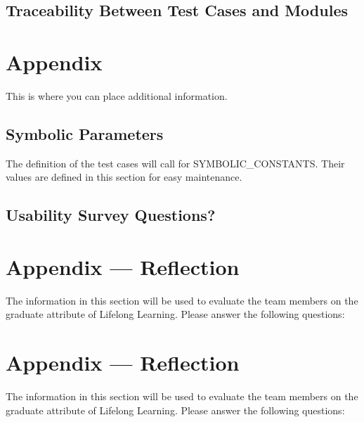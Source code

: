 \documentclass[12pt, titlepage]{article}
\begin{document}
\subsection{Traceability Between Test Cases and Modules}

				




\newpage

\section{Appendix}

This is where you can place additional information.

\subsection{Symbolic Parameters}

The definition of the test cases will call for SYMBOLIC\_CONSTANTS.
Their values are defined in this section for easy maintenance.

\subsection{Usability Survey Questions?}


\newpage{}
\section*{Appendix --- Reflection}

The information in this section will be used to evaluate the team members on the
graduate attribute of Lifelong Learning.  Please answer the following questions:

\newpage{}
\section*{Appendix --- Reflection}


The information in this section will be used to evaluate the team members on the
graduate attribute of Lifelong Learning.  Please answer the following questions:
\end{document}
